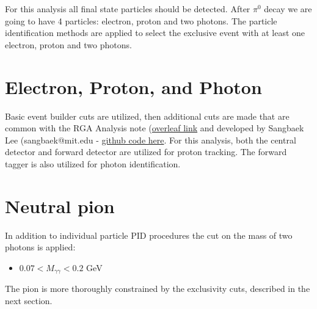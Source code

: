 
For this analysis all final state particles should be detected.
After $\pi^0$ decay we are going to have 4 particles: electron, proton and two photons.
The particle identification methods are applied to select the exclusive event with at least one electron, proton and two photons. 


\section{Electron, Proton, and Photon}
Basic event builder cuts are utilized, then additional cuts are made that are common with the RGA Analysis note (\href{https://www.overleaf.com/project/5ea737720942930001ff5e9c}{overleaf link} and developed by Sangbaek Lee (sangbaek@mit.edu - \href{https://github.com/Sangbaek/analysis_code/tree/analysis/pid}{github code here}. For this analysis, both the central detector and forward detector are utilized for proton tracking. The forward tagger is also utilized for photon identification. 



\section{Neutral pion}
In addition to individual particle PID procedures the cut on the mass of two photons is applied:
\begin{itemize}
	\item $0.07<M_{\gamma\gamma}<0.2$ GeV
\end{itemize}
The pion is more thoroughly constrained by the exclusivity cuts, described in the next section.


